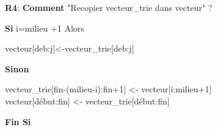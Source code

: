\documentclass{NewTeXRaffinage}
\begin{document}
\textbf{R4}: \textbf{Comment} "Recopier vecteur\_trie dans vecteur" ?
\begin{addmargin}[5em]{0pt}
    \textbf{Si} i=milieu +1 Alors
    \begin{addmargin}[3em]{0pt}
        vecteur[deb:j]<-vecteur\_trie[deb:j]
    \end{addmargin}
    \textbf{Sinon}
    \begin{addmargin}[3em]{0pt}
        vecteur\_trie[fin-(milieu-i):fin+1] <- vecteur[i:milieu+1] \\
        vecteur[début:fin] <- vecteur\_trie[début:fin]
    \end{addmargin}
    \textbf{Fin Si}
\end{addmargin}
\end{document}
